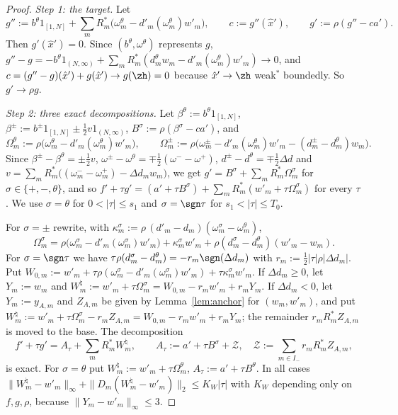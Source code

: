 \begin{proof}
\emph{Step 1: the target.}  Let
\[
 g'':=b^\theta1_{[1,N]}+\sum_mR_m^*\big(\omega^\theta_m-d'_m(\omega^\theta_m)
 w'_m\big),\qquad c:=g''(\hat x'),\qquad g':=\rho(g''-ca').
\]
Then $g'(\hat x')=0$.  Since $(b^\theta,\omega^\theta)$ represents $g$,
$g''-g=-b^\theta1_{(N,\infty)}+\sum_mR_m^*(d^\theta_mw_m-d'_m(\omega^\theta_m)
w'_m)\to0$, and $c=(g''-g)(\hat x')+g(\hat x')\to g(\zh)=0$ because $\hat
x'\to\zh$ weak$^*$ boundedly.  So $g'\to\rho g$.

\emph{Step 2: three exact decompositions.}  Let
$\beta^\theta:=b^\theta1_{[1,N]}$, $\beta^\pm:=b^\pm1_{[1,N]}\pm\frac12v
1_{(N,\infty)}$, $B^\sigma:=\rho(\beta^\sigma-ca')$, and
\[
 \Omega^\theta_m:=\rho\big(\omega^\theta_m-d'_m(\omega^\theta_m)w'_m\big),\qquad
 \Omega^\pm_m:=\rho\big(\omega^\pm_m-d'_m(\omega^\theta_m)w'_m-(d^\pm_m-
 d^\theta_m)w_m\big).
\]
Since $\beta^\pm-\beta^\theta=\pm\frac12v$, $\omega^\pm-\omega^\theta=
\mp\frac12(\omega^--\omega^+)$, $d^\pm-d^\theta=\mp\frac12\Delta d$ and
$v=\sum_mR_m^*\big((\omega^-_m-\omega^+_m)-\Delta d_mw_m\big)$, we get
$g'=B^\sigma+\sum_mR^*_m\Omega^\sigma_m$ for $\sigma\in\{+,-,\theta\}$, and
so $f'+\tau g'=(a'+\tau B^\sigma)+\sum_mR^*_m(w'_m+\tau\Omega^\sigma_m)$ for
every $\tau$.  We use $\sigma=\theta$ for $0<|\tau|\le s_1$ and
$\sigma=\sgn\tau$ for $s_1<|\tau|\le T_0$.

For $\sigma=\pm$ rewrite, with $\kappa^\sigma_m:=\rho\,(d'_m-d_m)(\omega^\sigma_m
-\omega^\theta_m)$,
\[
 \Omega^\sigma_m=\rho\big(\omega^\sigma_m-d'_m(\omega^\sigma_m)w'_m\big)+
 \kappa^\sigma_mw'_m+\rho(d^\sigma_m-d^\theta_m)(w'_m-w_m).
\]
For $\sigma=\sgn\tau$ we have $\tau\rho(d^\sigma_m-d^\theta_m)=-r_m\sgn
(\Delta d_m)$ with $r_m:=\frac12|\tau|\rho|\Delta d_m|$.  Put
$W_{0,m}:=w'_m+\tau\rho(\omega^\sigma_m-d'_m(\omega^\sigma_m)w'_m)+
\tau\kappa^\sigma_mw'_m$.  If $\Delta d_m\ge0$, let $Y_m:=w_m$ and
$W^\natural_m:=w'_m+\tau\Omega^\sigma_m=W_{0,m}-r_mw'_m+r_mY_m$.  If
$\Delta d_m<0$, let $Y_m:=y_{A,m}$ and $Z_{A,m}$ be given by
Lemma~\ref{lem:anchor} for $(w_m,w'_m)$, and put $W^\natural_m:=w'_m+\tau
\Omega^\sigma_m-r_mZ_{A,m}=W_{0,m}-r_mw'_m+r_mY_m$; the remainder
$r_mR^*_mZ_{A,m}$ is moved to the base.  The decomposition
\[
 f'+\tau g'=A_\tau+\sum_mR^*_mW^\natural_m,\qquad A_\tau:=a'+\tau B^\sigma
 +\mathcal Z,\quad\mathcal Z:=\sum_{m\in I_-}r_mR^*_mZ_{A,m},
\]
is exact.  For $\sigma=\theta$ put $W^\natural_m:=w'_m+\tau\Omega^\theta_m$,
$A_\tau:=a'+\tau B^\theta$.  In all cases $\|W^\natural_m-w'_m\|_\infty+
\|D_m(W^\natural_m-w'_m)\|_2\le K_W|\tau|$ with $K_W$ depending only on
$f,g,\rho$, because $\|Y_m-w'_m\|_\infty\le3$.


\end{proof}
